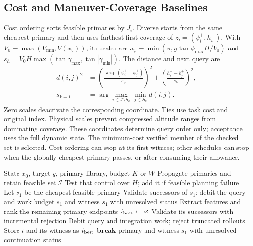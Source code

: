 \documentclass[journal]{IEEEtran}
\newcommand{\wrap}{\operatorname{wrap}}
\begin{document}
\subsection{Cost and Maneuver-Coverage Baselines}
Cost ordering sorts feasible primaries by $J_i$. Diverse starts from the same cheapest primary and then uses farthest-first coverage of $z_i=(\psi_i^+,h_i^+)$. With $V_0=\max(V_{\min},V(x_0))$, its scales are $s_\psi=\min(\pi,g\tan\phi_{\max}H/V_0)$ and $s_h=V_0H\max(\tan\gamma_{\max},\tan|\gamma_{\min}|)$. The distance and next query are
\begin{align}
 d(i,j)^2&=\left(\frac{\wrap(\psi_i^+-\psi_j^+)}{s_\psi}\right)^2
           +\left(\frac{h_i^+-h_j^+}{s_h}\right)^2,\label{eq:metric}\\
 s_{k+1}&=\arg\max_{i\in\mathcal I\setminus S_k}\min_{j\in S_k}d(i,j).
 \label{eq:schedule}
\end{align}
Zero scales deactivate the corresponding coordinate. Ties use task cost and original index. Physical scales prevent compressed altitude ranges from dominating coverage. These coordinates determine query order only; acceptance uses the full dynamic state. The minimum-cost verified member of the checked set is selected. Cost ordering can stop at its first witness; other schedules can stop when the globally cheapest primary passes, or after consuming their allowance.

\begin{algorithm}[t]
\caption{Deferred learned continuation selection}
\label{alg:search}
\begin{algorithmic}[1]
\Require State $x_0$, target $g$, primary library, budget $K$ or $W$
\State Propagate primaries and retain feasible set $\mathcal I$
 \State Test that control over $H$; add it if feasible
\EndIf
{}\State \Return planning failure\EndIf
\State Let $s_1$ be the cheapest feasible primary
\State Validate successors of $s_1$; debit the query and work budget
\State \Return $s_1$ and witness\EndIf
{}\State \Return $s_1$ with unresolved status\EndIf
\State Extract features and rank the remaining primary endpoints
\State $i_{\rm best}\gets\varnothing$
 \State Validate its successors with incremental rejection
 \State Debit query and integration work; reject truncated rollouts
  \State Store $i$ and its witness as $i_{\rm best}$
 \EndIf
  \State \textbf{break}
 \EndIf
\EndFor
{}\State \Return primary and witness
\Else\State \Return $s_1$ with unresolved continuation status
\EndIf
\end{algorithmic}
\end{algorithm}
\end{document}
